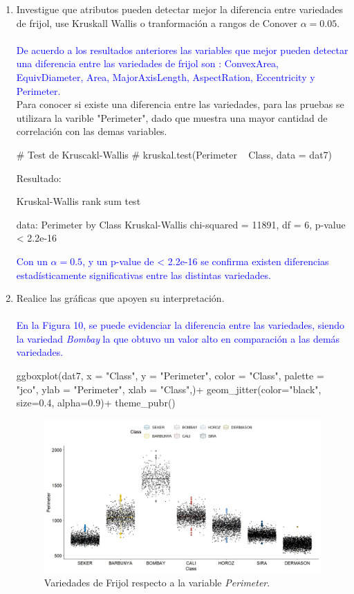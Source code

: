 \documentclass[a4paper,12pt]{article}
\begin{document}
\begin{enumerate} [label=\textbf{\alph*})]
\textcolor{blue}{Para estos datos, las pruebas de correlación coinciden mostrando indices similares y comportamientos positivos negativos y positivos en las mismas variables, estas variables como: ConvexArea, EquivDiameter, Area, MajorAxisLength, AspectRation y Eccentricity.}
\item Investigue que atributos pueden detectar mejor la diferencia entre variedades de frijol, use Kruskall Wallis o tranformación a rangos de Conover \(\alpha=0.05\).\\
\\\textcolor{blue}{De acuerdo a los resultados anteriores las variables que mejor pueden detectar una diferencia entre las variedades de frijol son : ConvexArea, EquivDiameter, Area, MajorAxisLength, AspectRation, Eccentricity y Perimeter.}  
\\Para conocer si existe una diferencia entre las variedades, para las pruebas se utilizara la varible "Perimeter", dado que muestra una mayor cantidad de correlación con las demas variables. 
\begin{MyVerbatim}
# Test de Kruscakl-Wallis #
kruskal.test(Perimeter ~ Class, data = dat7)	
\end{MyVerbatim} 
Resultado:

\begin{MyVerbatim}
Kruskal-Wallis rank sum test

data:  Perimeter by Class
Kruskal-Wallis chi-squared = 11891, df = 6, p-value < 2.2e-16
\end{MyVerbatim}
\textcolor{blue}{Con un \(\alpha=0.5\), y un p-value de < 2.2e-16 se confirma existen diferencias estadísticamente significativas entre las distintas variedades.}
\item Realice las gráficas que apoyen su interpretación.\\
\\\textcolor{blue} {En la Figura 10, se puede evidenciar la diferencia entre las variedades, siendo la variedad \textit{Bombay} la que obtuvo un valor alto en comparación a las demás variedades.}
\begin{MyVerbatim}
ggboxplot(dat7, x = "Class", y = "Perimeter", 
color = "Class", palette = "jco", 
ylab = "Perimeter", xlab = "Class",)+
geom_jitter(color="black", size=0.4, alpha=0.9)+
theme_pubr()	
\end{MyVerbatim}
\begin{figure}[H]
	\centering
	\includegraphics[width=0.7\linewidth]{prob7_boxfrij}
	\caption[prob7_boxfrij]{Variedades de Frijol respecto a la variable \textit{Perimeter}.}
	\label{fig.prob7boxfrij}
\end{figure}

\end{enumerate}
\end{document}
